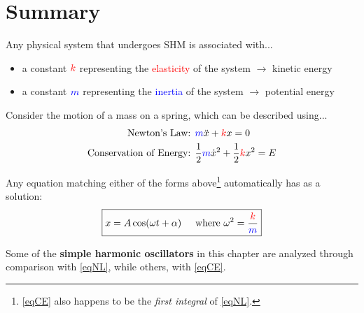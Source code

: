 \documentclass[11pt,letterpaper,titlepage,oneside]{book}
\begin{document}
\section{Summary}
Any physical system that undergoes SHM is associated with...
\begin{itemize}
	\item a constant $\color{red}{k}$ representing the \textcolor{red}{elasticity} of the system $\longrightarrow$ kinetic energy
	\item a constant $\color{blue}{m}$ representing the \textcolor{blue}{inertia} of the system $\longrightarrow$ potential energy
\end{itemize}

Consider the motion of a mass on a spring, which can be described using...
\begin{align}
	\text{Newton's Law: }&
	\textcolor{blue}{m}\ddot{x} + \textcolor{red}{k}x = 0 \label{eqNL} \\
	\text{Conservation of Energy: }&
	\frac{1}{2}\textcolor{blue}{m}\dot{x}^2 + \frac{1}{2}\textcolor{red}{k}x^2 = E \label{eqCE}
\end{align}

Any equation matching either of the forms above\footnote{\eqref{eqCE} also happens to be the \textit{first integral} of  \eqref{eqNL}.} automatically has as a solution:
\begin{equation}
\boxed{x = A \cos(\omega t+\alpha)\hspace{0.5cm}\text{where }\omega^2 = \frac{\color{red}{k}}{\color{blue}m}} \label{eqSHMsoln}
\end{equation}

Some of the \textbf{simple harmonic oscillators} in this chapter are analyzed through comparison with \eqref{eqNL}, while others, with \eqref{eqCE}.
\end{document}
